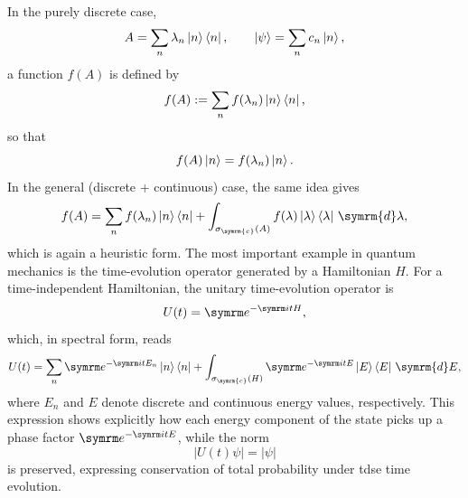In the purely discrete case,
\begin{equation}
A=\sum_n\lambda_n\ket{n}\bra{n},\qquad\ket{\psi}=\sum_n c_n\ket{n},
\end{equation}
a function $f(A)$ is defined by
\begin{equation}
f(A):=\sum_n f(\lambda_n)\ket{n}\bra{n},
\end{equation}
so that
\begin{equation}
f(A)\ket{n}=f(\lambda_n)\ket{n}.
\end{equation}
In the general (discrete + continuous) case, the same idea gives
\begin{equation}
f(A)=\sum_n f(\lambda_n)\ket{n}\bra{n}+\int_{\sigma_{\symrm{c}}(A)}f(\lambda)\ket{\lambda}\bra{\lambda}\,\symrm{d}\lambda,
\end{equation}
which is again a heuristic form. The most important example in quantum mechanics is the time-evolution operator generated by a Hamiltonian $H$. For a time-independent Hamiltonian, the unitary time-evolution operator is
\begin{equation}
U(t)=\e^{-\i tH},
\end{equation}
which, in spectral form, reads
\begin{equation}
U(t)=\sum_n\e^{-\i tE_n} \ket{n}\bra{n}+\int_{\sigma_{\symrm{c}}(H)}\e^{-\i tE}\ket{E}\bra{E}\,\symrm{d}E,
\end{equation}
where $E_n$ and $E$ denote discrete and continuous energy values, respectively. This expression shows explicitly how each energy component of the state picks up a phase factor $\e^{-\i tE}$, while the norm
\begin{equation}
\lvert U(t)\psi\rvert=\lvert\psi\rvert
\end{equation}
is preserved, expressing conservation of total probability under \gls{tdse} time evolution.
